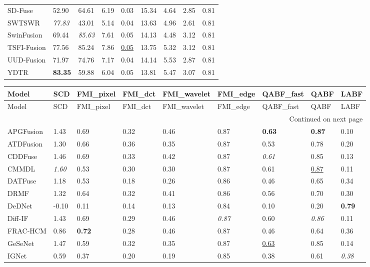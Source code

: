 {\begin{longtable}{lllllllll}
SD-Fuse & 52.90 & 64.61 & 6.19 & 0.03 & 15.34 & 4.64 & 2.85 & 0.81 \\
SWTSWR & \textit{77.83} & 43.01 & 5.14 & 0.04 & 13.63 & 4.96 & 2.61 & 0.81 \\
SwinFusion & 69.44 & \textit{85.63} & 7.61 & 0.05 & 14.13 & 4.48 & 3.12 & 0.81 \\
TSFI-Fusion & 77.56 & 85.24 & 7.86 & \underline{0.05} & 13.75 & 5.32 & 3.12 & 0.81 \\
UUD-Fusion & 71.97 & 74.76 & 7.17 & 0.04 & 14.14 & 5.53 & 2.87 & 0.81 \\
YDTR & \textbf{83.35} & 59.88 & 6.04 & 0.05 & 13.81 & 5.47 & 3.07 & 0.81 \\
\end{longtable}
}

{\small
\begin{longtable}{lllllllll}
\toprule
Model & SCD & FMI_pixel & FMI_dct & FMI_wavelet & FMI_edge & QABF_fast & QABF & LABF \\
\midrule
\endfirsthead
\toprule
Model & SCD & FMI_pixel & FMI_dct & FMI_wavelet & FMI_edge & QABF_fast & QABF & LABF \\
\midrule
\endhead
\midrule
\multicolumn{9}{r}{Continued on next page} \\
\midrule
\endfoot
\bottomrule
\endlastfoot
APGFusion & 1.43 & 0.69 & 0.32 & 0.46 & 0.87 & \textbf{0.63} & \textbf{0.87} & 0.10 \\
ATDFusion & 1.30 & 0.66 & 0.36 & 0.35 & 0.87 & 0.53 & 0.78 & 0.20 \\
CDDFuse & 1.46 & 0.69 & 0.33 & 0.42 & 0.87 & \textit{0.61} & 0.85 & 0.13 \\
CMMDL & \textit{1.60} & 0.53 & 0.30 & 0.30 & 0.87 & 0.61 & \underline{0.87} & 0.11 \\
DATFuse & 1.18 & 0.53 & 0.18 & 0.26 & 0.86 & 0.46 & 0.65 & 0.34 \\
DRMF & 1.32 & 0.64 & 0.32 & 0.41 & 0.86 & 0.56 & 0.70 & 0.30 \\
DeDNet & -0.10 & 0.11 & 0.14 & 0.13 & 0.84 & 0.10 & 0.20 & \textbf{0.79} \\
Diff-IF & 1.43 & 0.69 & 0.29 & 0.46 & \textit{0.87} & 0.60 & \textit{0.86} & 0.11 \\
FRAC-HCM & 0.86 & \textbf{0.72} & 0.28 & 0.46 & 0.87 & 0.46 & 0.64 & 0.36 \\
GeSeNet & 1.47 & 0.59 & 0.32 & 0.35 & 0.87 & \underline{0.63} & 0.85 & 0.14 \\
IGNet & 0.59 & 0.37 & 0.20 & 0.19 & 0.85 & 0.38 & 0.61 & \textit{0.38} \\

\end{longtable}}
